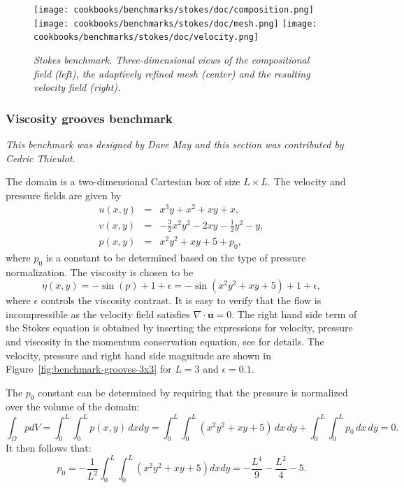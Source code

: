 \documentclass{article}
\begin{document}
\begin{figure}
  \begin{center}
    \texttt{[image: cookbooks/benchmarks/stokes/doc/composition.png]}
    \hfill
    \texttt{[image: cookbooks/benchmarks/stokes/doc/mesh.png]}
    \hfill
    \texttt{[image: cookbooks/benchmarks/stokes/doc/velocity.png]}
  \end{center}
  \caption{\it Stokes benchmark. Three-dimensional views of the compositional
  field (left), the adaptively refined mesh (center) and the resulting velocity field
  (right).}
  \label{fig:stokes-falling-sphere-3d}
\end{figure}



\subsubsection{Viscosity grooves benchmark}
\label{sec:viscosity_grooves}

\textit{This benchmark was designed by Dave May and this section was contributed by Cedric Thieulot.}

The domain is a two-dimensional Cartesian box of size $L\times L$.
The velocity and pressure fields are given by
\begin{eqnarray}
u(x,y) &=& x^3 y + x^2 + xy + x, \\
v(x,y) &=& -\frac{3}{2}x^2y^2 - 2xy - \frac{1}{2}y^2 - y, \\
p(x,y) &=& x^2y^2 + xy + 5 + p_0,
\end{eqnarray}
where $p_0$ is a constant to be determined based on the type of pressure normalization.
The viscosity is chosen to be
\begin{equation}
\eta(x,y)=-\sin(p)+1+\epsilon = -\sin (x^2y^2 + xy + 5) + 1 + \epsilon,
\end{equation}
where $\epsilon$ controls the viscosity contrast.
It is easy to verify that the flow is incompressible as the velocity field satisfies $\nabla\cdot \mathbf u = 0$.
The right hand side term of the Stokes equation is obtained by inserting
the expressions for velocity, pressure and viscosity in the momentum conservation equation, see \cite{fieldstone} for details.
The velocity, pressure and right hand side magnitude are shown in Figure~\ref{fig:benchmark-grooves-3x3}
for $L=3$ and $\epsilon=0.1$.

The $p_0$ constant can be determined by requiring that the pressure is normalized over the
volume of the domain:
\begin{equation}
\int_\Omega p dV=
\int_0^L\int_0^L p(x,y) \, dx dy =
\int_0^L\int_0^L (x^2y^2+xy+5)\, dx \, dy + \int_0^L \int_0^L p_0 \, dx \, dy =0.
\end{equation}
It then follows that:
\begin{equation}
p_0 =-  \frac{1}{L^2}  \int_0^L\int_0^L (x^2y^2+xy+5) dx dy
= -\frac{L^4}{9}-\frac{L^2}{4} - 5.
\end{equation}
\end{document}
